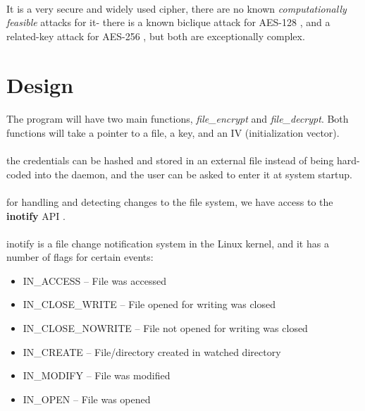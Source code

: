\documentclass{article}
\begin{document}
    \paragraph{}It is a very secure and widely used cipher, there are no known \textit{computationally feasible} attacks for it- there is a known biclique attack for AES-128 \parencite{aes_attack}, and a related-key attack for AES-256 \parencite{aes_256_attack} \parencite{aes_256_attack_2}, but both are exceptionally complex.
    

\section{Design}
    \paragraph{}The program will have two main functions, \textit{file\_encrypt} and \textit{file\_decrypt}. Both functions will take a pointer to a file, a key, and an IV (initialization vector).
    \paragraph{}the credentials can be hashed and stored in an external file instead of being hard-coded into the daemon, and the user can be asked to enter it at system startup.
    \paragraph{}for handling and detecting changes to the file system, we have access to the \textbf{inotify} API \parencite{inotify_manpage}.
    \paragraph{}inotify is a file change notification system in the Linux kernel, and it has a number of flags for certain events:
    \begin{itemize}
        \item IN\_ACCESS – File was accessed
        \item IN\_CLOSE\_WRITE – File opened for writing was closed
        \item IN\_CLOSE\_NOWRITE – File not opened for writing was closed
        \item IN\_CREATE – File/directory created in watched directory
        \item IN\_MODIFY – File was modified
        \item IN\_OPEN – File was opened
    \end{itemize}
\end{document}
